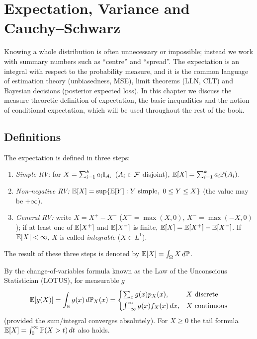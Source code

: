 \documentclass[main.tex]{subfiles}
\begin{document}
\chapter{Expectation, Variance and Cauchy--Schwarz}\label{ch:beklenen-deger}

Knowing a whole distribution is often unnecessary or impossible; instead we work with summary numbers such as ``centre'' and ``spread''. The expectation is an integral with respect to the probability measure, and it is the common language of estimation theory (unbiasedness, MSE), limit theorems (LLN, CLT) and Bayesian decisions (posterior expected loss). In this chapter we discuss the measure-theoretic definition of expectation, the basic inequalities and the notion of conditional expectation, which will be used throughout the rest of the book.

\section{Definitions}

\begin{definition}\label{def:beklenen}
The expectation is defined in three steps:
\begin{enumerate}
  \item \emph{Simple RV:} for $X=\sum_{i=1}^k a_i\mathbb{I}_{A_i}$ ($A_i\in\mathcal{F}$ disjoint), $\mathbb{E}[X]=\sum_{i=1}^k a_i\mathbb{P}(A_i)$.
  \item \emph{Non-negative RV:} $\mathbb{E}[X]=\sup\{\mathbb{E}[Y]: Y \text{ simple},\ 0\le Y\le X\}$ (the value may be $+\infty$).
  \item \emph{General RV:} write $X=X^+-X^-$ ($X^+=\max(X,0)$, $X^-=\max(-X,0)$); if at least one of $\mathbb{E}[X^+]$ and $\mathbb{E}[X^-]$ is finite, $\mathbb{E}[X]=\mathbb{E}[X^+]-\mathbb{E}[X^-]$. If $\mathbb{E}|X|<\infty$, $X$ is called \emph{integrable} ($X\in L^1$).
\end{enumerate}
The result of these three steps is denoted by $\mathbb{E}[X] = \int_\Omega X \, d\mathbb{P}$.
\end{definition}

\begin{remark}
By the change-of-variables formula known as the Law of the Unconscious Statistician (LOTUS), for measurable $g$
\[
\mathbb{E}[g(X)]=\int_{\mathbb{R}} g(x)\,d\mathbb{P}_X(x)=\begin{cases}\sum_x g(x)p_X(x), & X \text{ discrete}\\[2pt] \int_{-\infty}^\infty g(x)f_X(x)\,dx, & X \text{ continuous}\end{cases}
\]
(provided the sum/integral converges absolutely). For $X\ge0$ the tail formula $\mathbb{E}[X]=\int_0^\infty \mathbb{P}(X>t)\,dt$ also holds.
\end{remark}
\end{document}

